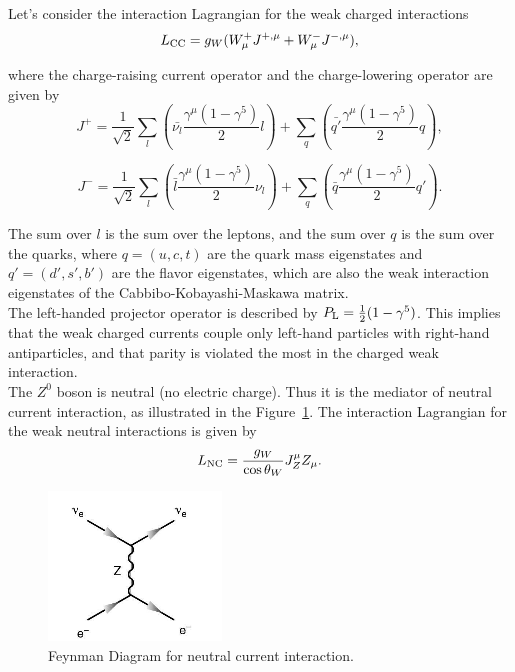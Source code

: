 \documentclass[10pt,swedish, openany]{book}
\begin{document}
Let's consider the interaction Lagrangian for the weak charged interactions
\begin{equation}
    L_{\rm CC} = g_W(W^+_{\mu}J^{+ ,\mu} + W^-_{\mu}J^{- ,\mu}),
\end{equation}

where the charge-raising current operator and the charge-lowering operator are given by
\begin{equation}
    J^+ = \frac{1}{\sqrt{2}} \sum_l (\bar{\nu_l}\frac{\gamma^{\mu}(1-\gamma^5)}{2}l) + \sum_q (\bar{q'}\frac{\gamma^{\mu}(1-\gamma^5)}{2}q),
\end{equation}

\begin{equation}
    J^- = \frac{1}{\sqrt{2}} \sum_l (\bar{l}\frac{\gamma^{\mu}(1-\gamma^5)}{2}\nu_l) + \sum_q (\bar{q}\frac{\gamma^{\mu}(1-\gamma^5)}{2}q').
\end{equation}

The sum over $l$ is the sum over the leptons, and the sum over $q$ is the sum over the quarks, where $q=(u,c,t)$ are the quark mass eigenstates and $q'=(d',s',b')$ are the flavor eigenstates, which are also the weak interaction eigenstates of the Cabbibo-Kobayashi-Maskawa matrix.\\

The left-handed projector operator is described by $P_{\rm L}=\frac{1}{2}(1-\gamma^5)$. This implies that the weak charged currents couple only  left-hand particles with right-hand antiparticles, and that parity is violated the most in the charged weak interaction. \\

The $Z^0$ boson is neutral (no electric charge). Thus it is the mediator of neutral current interaction, as illustrated in the Figure~\ref{fig:ZInteraction}. The interaction Lagrangian for the weak neutral interactions is given by
\begin{equation}
    L_{\rm NC} = \frac{g_W}{\cos{\theta_W}}J^{\mu}_Z Z_{\mu}.
\end{equation}

\begin{figure}[h]
\includegraphics[scale=0.8]{neutral.png}
\centering
\caption{Feynman Diagram for neutral current interaction.}
\label{fig:ZInteraction}
\end{figure}  
\end{document}
